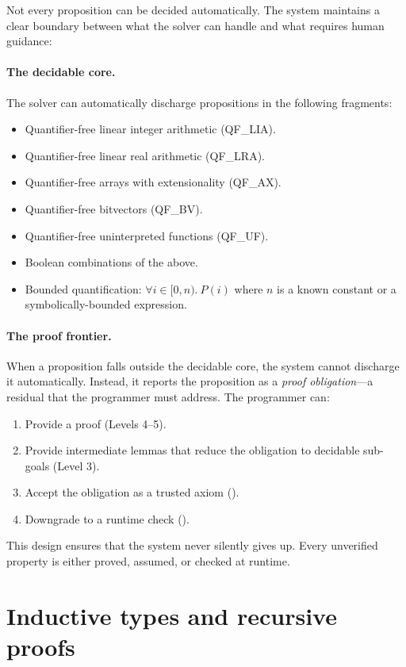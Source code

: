 \documentclass[11pt]{report}
\DeclareRobustCommand{\py}[1]{\texttt{\detokenize{#1}}}
\theoremstyle{definition}
\theoremstyle{plain}
\begin{document}
Not every proposition can be decided automatically. The system maintains a
clear boundary between what the solver can handle and what requires human
guidance:

\paragraph{The decidable core.}
The solver can automatically discharge propositions in the following
fragments:
\begin{itemize}[nosep]
  \item Quantifier-free linear integer arithmetic (QF\_LIA).
  \item Quantifier-free linear real arithmetic (QF\_LRA).
  \item Quantifier-free arrays with extensionality (QF\_AX).
  \item Quantifier-free bitvectors (QF\_BV).
  \item Quantifier-free uninterpreted functions (QF\_UF).
  \item Boolean combinations of the above.
  \item Bounded quantification: $\forall i \in [0, n).\ P(i)$ where $n$ is
        a known constant or a symbolically-bounded expression.
\end{itemize}

\paragraph{The proof frontier.}
When a proposition falls outside the decidable core, the system cannot
discharge it automatically. Instead, it reports the proposition as a
\emph{proof obligation}---a residual that the programmer must address. The
programmer can:
\begin{enumerate}[nosep]
  \item Provide a proof (Levels 4--5).
  \item Provide intermediate lemmas that reduce the obligation to decidable
        sub-goals (Level 3).
  \item Accept the obligation as a trusted axiom (\py{@assume}).
  \item Downgrade to a runtime check (\py{@check}).
\end{enumerate}

This design ensures that the system never silently gives up. Every
unverified property is either proved, assumed, or checked at runtime.

\section{Inductive types and recursive proofs}
\end{document}

